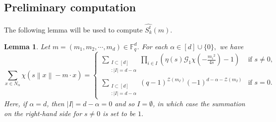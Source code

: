 \documentclass[a4paper,11pt]{amsart}
\numberwithin{equation}{section}
\newtheorem{lemma}[theorem]{Lemma}
\def\Fq#1{\mathbb{F}_q^{#1}}
\def\norm#1{\left\lVert#1\right\lVert}
\begin{document}
\subsection{Preliminary computation}
The following lemma will be used to compute $\widehat{S_{k}^t}(m).$
\begin{lemma} \label{Lem3.1} Let $m = (m_1, m_2, \cdots, m_d)\in \Fq{d}$. For each  $\alpha \in [d]\cup \{0\},$  we have
\begin{equation*}\label{m}
    \displaystyle{\sum_{x \in N_\alpha} \chi(s\norm{x} - m\cdot x)} = \begin{cases} 		\displaystyle{\sum_{\substack{{I \subset [d]}\\{:|I| = d-\alpha}}} \prod_{i \in I}\left(\eta(s)\mathcal{G}_1\chi\left(-\frac{{m_i}^2}{4s}\right)-1\right)} & \text{if } s\neq 0, \\ 
         \displaystyle{\sum_{\substack{{I \subset [d]}\\{:|I| = d-\alpha}}}(q-1)^{\mathcal{Z}(m_{I})}(-1)^{d-\alpha-\mathcal{Z}(m_I)}} & \text{if } s = 0.
     \end{cases}
\end{equation*}
Here, if $\alpha=d$, then $|I| = d-\alpha=0$ and so $I=\emptyset$, in which case the summation on the right-hand side for $s\ne 0$ is set to be $1.$ 
\end{lemma}
\end{document}

